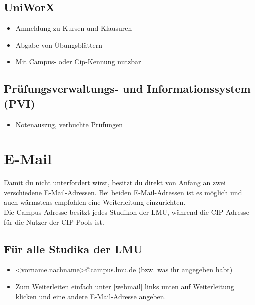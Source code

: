 \subsection*{UniWorX\subjectList{\subjectI{}\subjectMI{}}}
\begin{itemize}
	\item Anmeldung zu Kursen und Klausuren
	\item Abgabe von Übungsblättern
	\item Mit Campus- oder Cip-Kennung nutzbar
\end{itemize}
\begin{urlList}
\end{urlList}

\subsection*{Prüfungsverwaltungs- und Informationssystem (PVI)\subjectList{\subjectI{}\subjectMI{}}}
\begin{itemize}
	\item Notenauszug, verbuchte Prüfungen
\end{itemize}
\begin{urlList}
\end{urlList}

\section{E-Mail}
Damit du nicht unterfordert wirst, besitzt du direkt von Anfang an zwei verschiedene E-Mail-Adressen. Bei beiden E-Mail-Adressen ist es möglich und auch wärmstens empfohlen eine Weiterleitung einzurichten.\\

Die Campus-Adresse besitzt jedes Studikon der LMU, während die CIP-Adresse für die Nutzer der CIP-Pools ist.

\subsection*{Für alle Studika der LMU}
\begin{itemize}
	\item <vorname.nachname>@campus.lmu.de (bzw. was ihr angegeben habt)
	\item Zum Weiterleiten einfach unter \ref{webmail} links unten auf Weiterleitung klicken und eine andere E-Mail-Adresse angeben.
\end{itemize}
	\begin{urlList}
		\end{urlList} 

